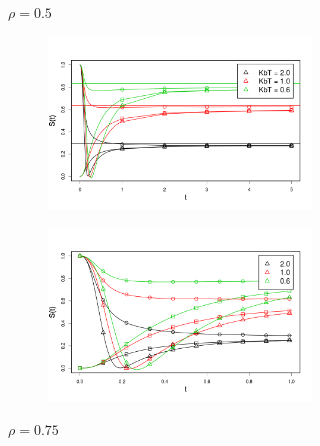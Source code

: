 \begin{figure}[h]
\begin{subfigure}[t]{0.32\textwidth}
\begin{subfigure}[t]{\textwidth}
\end{subfigure}
	\captionsetup{justification=centering, width=0.9\columnwidth}
	\caption{$\rho = 0.5$}
\end{subfigure}
\begin{subfigure}[t]{0.32\textwidth}
\begin{subfigure}[t]{\textwidth}
	\centering
	\includegraphics[width=\textwidth]{Images/op_relaxation_long_rho_075.png}
\end{subfigure}
\begin{subfigure}[t]{\textwidth}
	\centering
	\includegraphics[width=\textwidth]{Images/op_relaxation_short_rho_075.png}
\end{subfigure}
	\captionsetup{justification=centering, width=0.9\columnwidth}
	\caption{$\rho = 0.75$}
\end{subfigure}
\begin{subfigure}[t]{0.32\textwidth}
\begin{subfigure}[t]{\textwidth}

\end{subfigure}
\end{subfigure}
\end{figure}
